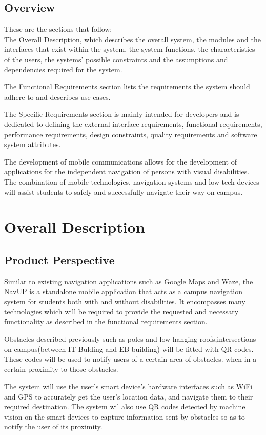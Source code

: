 \documentclass{article}
\begin{document}
	\subsection{Overview}
		These are the sections that follow; \\
		The Overall Description, which describes the overall system, the modules and the interfaces that exist within the system, the system functions, the characteristics of the users, the systems' possible constraints and the assumptions and dependencies required for the system.\par
		The Functional Requirements section lists the requirements the system should adhere to and describes use cases.\par
		The Specific Requirements section is mainly intended for developers and is dedicated to defining the external interface requirements, functional requirements, performance requirements, design constraints, quality requirements and software system attributes. \par
		The development of mobile communications allows for the development of applications for the independent navigation of persons with visual disabilities. The combination of mobile technologies, navigation systems and low tech devices will assist students to safely and successfully navigate their way on campus.	
		 

\newpage
\section{Overall Description}

	\subsection{Product Perspective}
		Similar to existing navigation applications such as Google Maps and Waze, the NavUP is a standalone mobile application that acts as a campus navigation system for students both with and without disabilities. It encompasses many technologies which will be required to provide the requested and necessary functionality as described in the functional requirements section.\\ \par
		Obstacles described previously such as poles and low hanging roofs,intersections on campus(between IT Bulding and EB building)  will be fitted with QR codes. These codes will be used to notify users of a certain area of obstacles. when in a certain proximity to those obstacles.\par
		The system will use the user's smart device's hardware interfaces such as WiFi and GPS to accurately get the user's location data, and navigate them to their required destination. The system wil also use QR codes detected by machine vision on the smart devices to capture information sent by obstacles so as to notify the user of its proximity.\\
		
\end{document}
